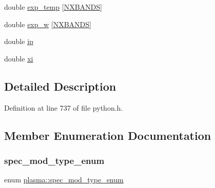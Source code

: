\begin{DoxyCompactItemize}
\item 
double \hyperlink{structplasma_a30222105e41ccde304250f41d25b5ad7}{exp\+\_\+temp} \mbox{[}\hyperlink{python_8h_ac640b7fc429348ef2f6781704d3c5163}{N\+X\+B\+A\+N\+DS}\mbox{]}
\item 
double \hyperlink{structplasma_a9b46e8bed0dfadca5cf9966301ecec6d}{exp\+\_\+w} \mbox{[}\hyperlink{python_8h_ac640b7fc429348ef2f6781704d3c5163}{N\+X\+B\+A\+N\+DS}\mbox{]}
\item 
double \hyperlink{structplasma_a1ac56fc73e1242bfa9cbb9bfa04e6d38}{ip}
\item 
double \hyperlink{structplasma_af8986403a916d5a9f4330ae70aa5e798}{xi}
\end{DoxyCompactItemize}


\subsection{Detailed Description}


Definition at line 737 of file python.\+h.



\subsection{Member Enumeration Documentation}
\mbox{\label{structplasma_a51fdb6f34dda1cdb03a9aebfee249706}} 
\subsubsection{\texorpdfstring{spec\+\_\+mod\+\_\+type\+\_\+enum}{spec\_mod\_type\_enum}}
{\footnotesize\ttfamily enum \hyperlink{structplasma_a51fdb6f34dda1cdb03a9aebfee249706}{plasma\+::spec\+\_\+mod\+\_\+type\+\_\+enum}}

